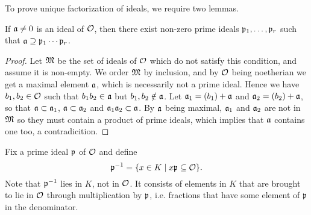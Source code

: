 To prove unique factorization of ideals, we require two lemmas.

\begin{lemma}
	If $\mathfrak{a}\neq 0$ is an ideal of $\mathcal{O}$, then there exist non-zero prime ideals $\mathfrak{p}_1,\dots,\mathfrak{p}_r$ such that $\mathfrak{a}\supseteq\mathfrak{p}_1\cdots\mathfrak{p}_r$.
\end{lemma}
\begin{proof}
	Let $\mathfrak{M}$ be the set of ideals of $\mathcal{O}$ which do not satisfy this condition, and assume it is non-empty. We order $\mathfrak{M}$ by inclusion, and by $\mathcal{O}$ being noetherian we get a maximal element $\mathfrak{a}$, which is necessarily not a prime ideal. Hence we have $b_1,b_2\in\mathcal{O}$ such that $b_1b_2\in\mathfrak{a}$ but $b_1,b_2\notin\mathfrak{a}$. Let $\mathfrak{a}_1 = (b_1) + \mathfrak{a}$ and $\mathfrak{a}_2 = (b_2) + \mathfrak{a}$, so that $\mathfrak{a}\subset\mathfrak{a}_1$, $\mathfrak{a}\subset\mathfrak{a}_2$ and $\mathfrak{a}_1\mathfrak{a}_2\subset\mathfrak{a}$. By $\mathfrak{a}$ being maximal, $\mathfrak{a}_1$ and $\mathfrak{a}_2$ are not in $\mathfrak{M}$ so they must contain a product of prime ideals, which implies that $\mathfrak{a}$ contains one too, a contradicition.
\end{proof}

Fix a prime ideal $\mathfrak{p}$ of $\mathcal{O}$ and define
\[
	\mathfrak{p}^{-1} = \{x\in K\mid x\mathfrak{p}\subseteq\mathcal{O}\}.
\]
Note that $\mathfrak{p}^{-1}$ lies in $K$, not in $\mathcal{O}$. It consists of elements in $K$ that are brought to lie in $\mathcal{O}$ through multiplication by $\mathfrak{p}$, i.e. fractions that have some element of $\mathfrak{p}$ in the denominator.

